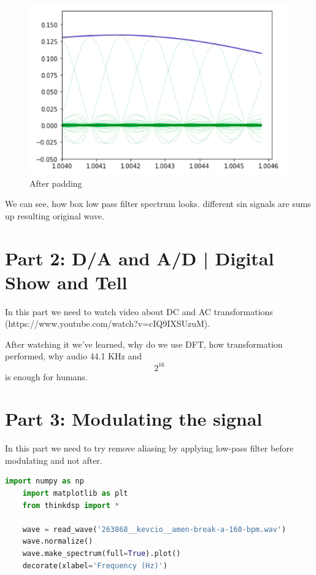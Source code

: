 \documentclass[a4paper]{article}
\begin{document}
        \begin{figure}[H]
            \centering
            \includegraphics[width=\textwidth]{img/p1_5.png}
            \caption{After padding}
            \label{fig:p1_2}
        \end{figure}
        
        We can see, how box low pass filter spectrum looks. different sin signals are sums up resulting original wave.
        
    \newpage
        \section{Part 2: D/A and A/D | Digital Show and Tell}
    
        In this part we need to watch video about DC and AC transformations (https://www.youtube.com/watch?v=cIQ9IXSUzuM).
        
        After watching it we've learned, why do we use DFT, how transformation performed, why audio 44.1 KHz and \[2^16\] is enough for humans.
        
    \newpage
        \section{Part 3: Modulating the signal}

        In this part we need to try remove aliasing by applying low-pass filter before modulating and not after.
        
        \begin{lstlisting}[language=Python,caption=Reading the signal,label={lst:part1_2}]
    import numpy as np
    import matplotlib as plt
    from thinkdsp import *
    
    wave = read_wave('263868__kevcio__amen-break-a-160-bpm.wav')
    wave.normalize()
    wave.make_spectrum(full=True).plot()
    decorate(xlabel='Frequency (Hz)')
        \end{lstlisting}
        
\end{document}
